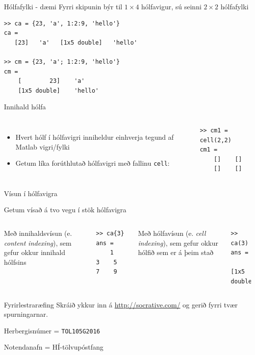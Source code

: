 \documentclass[handout]{beamer}
\begin{document}
\begin{frame}[fragile]{Hólfafylki - dæmi}
Fyrri skipunin býr til $1\times 4$ hólfavigur, sú seinni $2 \times 2$ hólfafylki
\begin{verbatim}
>> ca = {23, 'a', 1:2:9, 'hello'} 
ca = 
   [23]   'a'   [1x5 double]   'hello'

>> cm = {23, 'a'; 1:2:9, 'hello'}
cm = 
    [        23]    'a'    
    [1x5 double]    'hello'
\end{verbatim}
\end{frame}

\begin{frame}[fragile]{Innihald hólfa}
\begin{columns}
\begin{itemize}
 \item Hvert hólf í hólfavigri inniheldur einhverja tegund af Matlab vigri/fylki
 \item Getum líka forúthlutað hólfavigri með fallinu \texttt{cell}:
\end{itemize}
\begin{verbatim}
>> cm1 = cell(2,2)
cm1 = 
    []    []
    []    []
\end{verbatim}
\end{columns}
\end{frame}

\begin{frame}[fragile]{Vísun í hólfavigra}
\begin{center}
Getum vísað á tvo vegu í stök hólfavigra
\end{center}

\begin{columns}
Með innihaldsvísun (e. \emph{content indexing}), sem gefur okkur innihald hólfsins
\begin{verbatim}
>> ca{3}
ans =
    1    3    5    7    9
\end{verbatim}
Með hólfavísun (e. \emph{cell indexing}), sem gefur okkur hólfið sem er á þeim stað
\begin{verbatim}
>> ca(3)
ans = 
    [1x5 double]
\end{verbatim}
\end{columns}
\end{frame}

\begin{frame}{Fyrirlestraræfing}
Skráið ykkur inn á \url{http://socrative.com/} og gerið fyrri tvær spurningarnar.

Herbergisnúmer = \texttt{TOL105G2016}

Notendanafn = HÍ-tölvupóstfang
\end{frame}
\end{document}
